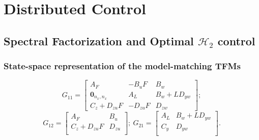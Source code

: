 \chapter{Distributed Control}

\section{Spectral Factorization and Optimal \(\mathcal{H}_2\) control}\label{appsec::optH2}
\subsection{State-space representation of the model-matching TFMs}
\begin{equation*}
    G_{11} = \left[\begin{array}{cc|c}
    A_F & -B_u F & B_w\\
   \mathbf{0}_{n_x,n_x} & A_L & B_w + L D_{yw}\\
    \hline
    C_z + D_{zu}F & -D_{zu}F & D_{zw}
\end{array}\right];
\end{equation*}
\begin{equation*}
G_{12} = \left[
    \begin{array}{c|c}
        A_F & B_u \\
        \hline
        C_z + D_{zu}F & D_{zu} \\
    \end{array}\right];\ 
G_{21} = \left[
    \begin{array}{c|c}
        A_L & B_w + L D_{yw}\\
        \hline
        C_y & D_{yw} \\
    \end{array}\right].
\end{equation*}
